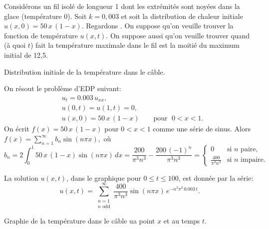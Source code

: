 \begin{example}

Considérons un fil isolé de longueur 1 dont
les extrémités sont noyées dans la glace (température 0).
Soit $ k = 0,003 $ et soit la distribution de chaleur initiale $ u (x, 0) = 50 \, x \, (1-x) $.
Regardons  .
On suppose qu'on veuille trouver la fonction de température $ u (x, t) $.  On suppose aussi qu'on veuille trouver quand (à quoi $ t $) fait la température maximale dans le fil
est la moitié du maximum initial de 12,5.

\begin{myfig}
\capstart
{}
\caption{Distribution initiale de la température dans le
câble.\label{heat:wireexinitfig}}
\end{myfig}

On résout le problème d'EDP suivant: 
\begin{align*}
& u_t = 0.003 \, u_{xx} , \\
& u(0,t) = u(1,t) = 0 , \\
& u(x,0) = 50\,x\,(1-x) \qquad \text{pour } \; 0 < x < 1 .
\end{align*}
On écrit $f(x) = 50\,x\,(1-x)$ pour $0 < x < 1$ comme une série de sinus.  Alors 
$
f(x) = \sum_{n=1}^\infty b_n \sin (n \pi x) ,
$
où
\begin{equation*}
b_n = 2 \int_0^1 50\,x\,(1-x) \sin (n \pi x) \,dx
= 
\frac{200}{{\pi }^{3}{n}^{3}}-\frac{200\,{\left( -1\right) }^{n}}{{\pi }^{3}{n}^{3}}
=
\begin{cases}
0 & \text{si } n \text{ paire} , \\
\frac{400}{\pi^3 n^3} & \text{si } n \text{ impaire} .
\end{cases}
\end{equation*}

La solution $u(x,t)$,  dans le graphique
 pour $0 \leq t \leq 100$,
est donnée par la série:
\begin{equation*}
u(x,t) = 
\sum_{\substack{n=1 \\ n \text{ odd}}}^\infty
\frac{400}{\pi^3 n^3}
\sin (n \pi x )
\, e^{-n^2 \pi^2 \, 0.003 \, t} .
\end{equation*}

\begin{myfig}
\capstart
{}
\caption{Graphie de la température dans le câble ua point $x$
et au temps $t$.\label{heat:wireexfig}}
\end{myfig}


\end{example}
